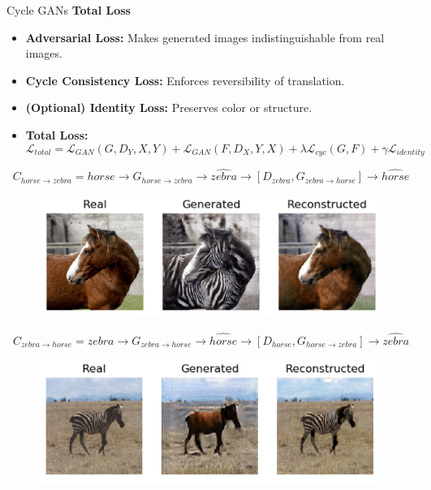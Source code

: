 \begin{frame}[allowframebreaks]{Cycle GANs}
\framebreak
\textbf{Total Loss}

\begin{itemize}
    \item \textbf{Adversarial Loss:} Makes generated images indistinguishable from real images.
    \item \textbf{Cycle Consistency Loss:} Enforces reversibility of translation.
    \item \textbf{(Optional) Identity Loss:} Preserves color or structure.
    \item \textbf{Total Loss:}
    \[
        \mathcal{L}_{total} = \mathcal{L}_{GAN}(G, D_Y, X, Y) + \mathcal{L}_{GAN}(F, D_X, Y, X) + \lambda \mathcal{L}_{cyc}(G, F) + \gamma \mathcal{L}_{identity}
    \]
\end{itemize}
\framebreak
$$C_{horse \rightarrow zebra} = horse \rightarrow G_{horse \rightarrow zebra} \rightarrow \hat{zebra} \rightarrow [D_{zebra}, G_{zebra \rightarrow horse}] \rightarrow \hat{horse}$$
\begin{figure}
    \centering
    \includegraphics[height=0.7\textheight, width=\textwidth, keepaspectratio]{images/gan/cycle_gan_2.png}
\end{figure}

\framebreak
$$C_{zebra \rightarrow horse} = zebra \rightarrow G_{zebra \rightarrow horse} \rightarrow \hat{horse} \rightarrow [D_{horse}, G_{horse \rightarrow zebra}] \rightarrow \hat{zebra}$$
\begin{figure}
    \centering
    \includegraphics[height=0.7\textheight, width=\textwidth, keepaspectratio]{images/gan/cycle_gan_3.png}
\end{figure}


\end{frame}
